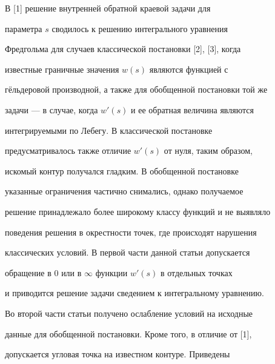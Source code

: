 \date{}




\pagestyle{plain} %







\maketitle


\label{begin}





В [1] решение внутренней обратной краевой задачи для


параметра $s$ сводилось к решению интегрального уравнения


Фредгольма для случаев классической постановки [2], [3], когда


известные граничные значения $w(s)$ являются функцией с


г\"ельдеровой производной, а также для обобщенной постановки той же


задачи --- в случае, когда $w'(s)$ и ее обратная величина являются


интегрируемыми по Лебегу. В классической постановке


предусматривалось также отличие $w'(s)$ от нуля, таким образом,


искомый контур получался гладким. В обобщенной постановке


указанные ограничения частично снимались, однако получаемое


решение принадлежало более широкому классу функций и не выявляло


поведения решения в окрестности точек, где происходят нарушения


классических условий. В первой части данной статьи допускается


обращение в $0$ или в $\infty$ функции $w'(s)$ в отдельных точках


и приводится решение задачи сведением к интегральному уравнению.


Во второй части статьи получено ослабление условий на исходные


данные для обобщенной постановки. Кроме того, в отличие от [1],


допускается угловая точка на известном контуре. Приведены


